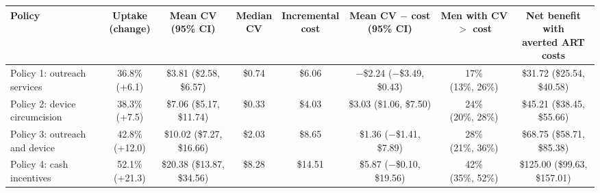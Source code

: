 \begin{tabular}{>{\raggedright\arraybackslash}p{2.7cm}ccccccc}
\toprule
Policy & \makecell{Uptake\\(change)} & \makecell{Mean CV\\(95\% CI)} & \makecell{Median\\CV} & \makecell{Incremental\\cost} & \makecell{Mean CV $-$ cost\\(95\% CI)} & \makecell{Men with\\CV $>$ cost} & \makecell{Net benefit with\\averted ART costs}
\\
\midrule
Policy 1: outreach services & \makecell{36.8\% \\ {\footnotesize (+6.1)}} & \makecell{\$3.81 \\ {\footnotesize (\$2.58, \$6.57)}} & \$0.74 & \$6.06 & \makecell{$-$\$2.24 \\ {\footnotesize ($-$\$3.49, \$0.43)}} & \makecell{17\% \\ {\footnotesize (13\%, 26\%)}} & \makecell{\$31.72 \\ {\footnotesize (\$25.54, \$40.58)}} \\
Policy 2: device circumcision & \makecell{38.3\% \\ {\footnotesize (+7.5)}} & \makecell{\$7.06 \\ {\footnotesize (\$5.17, \$11.74)}} & \$0.33 & \$4.03 & \makecell{\$3.03 \\ {\footnotesize (\$1.06, \$7.50)}} & \makecell{24\% \\ {\footnotesize (20\%, 28\%)}} & \makecell{\$45.21 \\ {\footnotesize (\$38.45, \$55.66)}} \\
Policy 3: outreach and device & \makecell{42.8\% \\ {\footnotesize (+12.0)}} & \makecell{\$10.02 \\ {\footnotesize (\$7.27, \$16.66)}} & \$2.03 & \$8.65 & \makecell{\$1.36 \\ {\footnotesize ($-$\$1.41, \$7.89)}} & \makecell{28\% \\ {\footnotesize (21\%, 36\%)}} & \makecell{\$68.75 \\ {\footnotesize (\$58.71, \$85.38)}} \\
Policy 4: cash incentives & \makecell{52.1\% \\ {\footnotesize (+21.3)}} & \makecell{\$20.38 \\ {\footnotesize (\$13.87, \$34.56)}} & \$8.28 & \$14.51 & \makecell{\$5.87 \\ {\footnotesize ($-$\$0.10, \$19.56)}} & \makecell{42\% \\ {\footnotesize (35\%, 52\%)}} & \makecell{\$125.00 \\ {\footnotesize (\$99.63, \$157.01)}} \\

\end{tabular}
